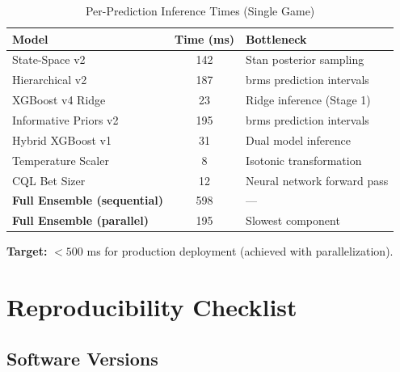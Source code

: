 \begin{table}[htbp]
\centering
\caption{Per-Prediction Inference Times (Single Game)}
\label{tab:inference-times}
\small
\begin{tabular}{@{} l S[table-format=3.0] l @{}}
\toprule
\textbf{Model} & \textbf{Time (ms)} & \textbf{Bottleneck} \\
\midrule
State-Space v2 & 142 & Stan posterior sampling \\
Hierarchical v2 & 187 & brms prediction intervals \\
XGBoost v4 Ridge & 23 & Ridge inference (Stage 1) \\
Informative Priors v2 & 195 & brms prediction intervals \\
Hybrid XGBoost v1 & 31 & Dual model inference \\
Temperature Scaler & 8 & Isotonic transformation \\
CQL Bet Sizer & 12 & Neural network forward pass \\
\baselinerule
\textbf{Full Ensemble (sequential)} & 598 & {---} \\
\textbf{Full Ensemble (parallel)} & 195 & Slowest component \\
\bottomrule
\end{tabular}

\vspace{2mm}
\begin{minipage}{\linewidth}
\small
\textbf{Target:} $< 500$ ms for production deployment (achieved with parallelization).
\end{minipage}
\end{table}

\section{Reproducibility Checklist}
\label{sec:reproducibility}

\subsection{Software Versions}

